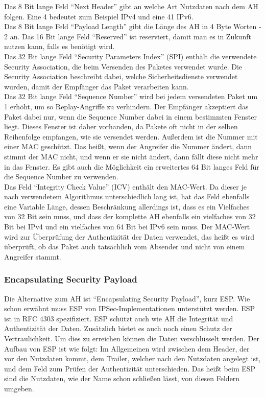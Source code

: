 \documentclass[12pt]{scrartcl}
\begin{document}

Das 8 Bit lange Feld "`Next Header"' gibt an welche Art Nutzdaten nach dem AH folgen. Eine 4 bedeutet zum Beispiel IPv4 und eine 41 IPv6.\\ 
Das 8 Bit lange Feld "`Payload Length"' gibt die Länge des AH in 4 Byte Worten - 2 an. Das 16 Bit lange Feld "`Reserved"' ist reserviert, damit man es in Zukunft nutzen kann, falls es benötigt wird.\\ 
Das 32 Bit lange Feld "`Security Parameters Index"' (SPI) enthält die verwendete Security Association, die beim Versenden des Paketes verwendet wurde. Die Security Association beschreibt dabei, welche Sicherheitsdienste verwendet wurden, damit der Empfänger das Paket verarbeiten kann.\\ 
Das 32 Bit lange Feld "`Sequence Number"' wird bei jedem versendeten Paket um 1 erhöht, um so Replay-Angriffe zu verhindern. Der Empfänger akzeptiert das Paket dabei nur, wenn die Sequence Number dabei in einem bestimmten Fenster liegt. Dieses Fenster ist daher vorhanden, da Pakete oft nicht in der selben Reihenfolge empfangen, wie sie versendet werden. Außerdem ist die Nummer mit einer MAC geschützt. Das heißt, wenn der Angreifer die Nummer ändert, dann stimmt der MAC nicht, und wenn er sie nicht ändert, dann fällt diese nicht mehr in das Fenster. Es gibt auch die Möglichkeit ein erweitertes 64 Bit langes Feld für die Sequence Number zu verwenden.\\
Das Feld "`Integrity Check Value"' (ICV) enthält den MAC-Wert. Da dieser je nach verwendetem Algorithmus unterschiedlich lang ist, hat das Feld ebenfalls eine Variable Länge, dessen Beschränkung allerdings ist, dass es ein Vielfaches von 32 Bit sein muss, und dass der komplette AH ebenfalls ein vielfaches von 32 Bit bei IPv4 und ein vielfaches von 64 Bit bei IPv6 sein muss. Der MAC-Wert wird zur Überprüfung der Authentizität der Daten verwendet, das heißt es wird überprüft, ob das Paket auch tatsächlich vom Absender und nicht von einem Angreifer stammt.

\subsubsection{Encapsulating Security Payload}
Die Alternative zum AH ist "`Encapsulating Security Payload"', kurz ESP. Wie schon erwähnt muss ESP von IPSec-Implementationen unterstützt werden. ESP ist in RFC 4303 spezifiziert.\cite{RFC4303}
ESP schützt auch wie AH die Integrität und Authentizität der Daten. Zusätzlich bietet es auch noch einen Schutz der Vertraulichkeit. Um dies zu erreichen können die Daten verschlüsselt werden. Der Aufbau von ESP ist wie folgt:
Im Allgemeinen wird zwischen dem Header, der vor den Nutzdaten kommt, dem Trailer, welcher nach den Nutzdaten angelegt ist, und dem Feld zum Prüfen der Authentizität unterschieden. Das heißt beim ESP sind die Nutzdaten, wie der Name schon schließen lässt, von diesen Feldern umgeben.
\end{document}
